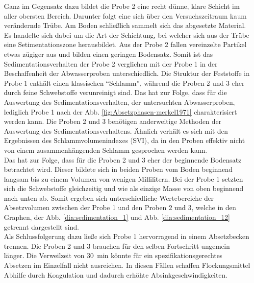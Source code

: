 Ganz im Gegensatz dazu bildet die Probe 2  eine recht dünne, klare Schicht im aller obersten Bereich. Darunter folgt eine sich über den Versuchszeitraum kaum verändernde Trübe. Am Boden schließlich sammelt sich das abgesetzte Material. Es handelte sich dabei um die Art der Schichtung, bei welcher sich aus der Trübe eine Setimentationszone herausbildet. Aus der Probe 2 fallen vereinzelte Partikel etwas zügiger aus und bilden einen geringen Bodensatz. Somit ist das Sedimentationsverhalten der Probe 2 verglichen mit der Probe 1 in der Beschaffenheit der Abwasserproben unterschiedlich.
Die Struktur der Feststoffe in Probe 1 enthält einen klassischen "`Schlamm"', während die Proben 2 und 3 eher durch feine Schwebstoffe verunreinigt sind. Das hat zur Folge, dass für die Auswertung des Sedimentationsverhalten, der untersuchten Abwasserproben, lediglich Probe 1 nach der Abb. \ref{fig:Absetzphasen-merkel1971} charakterisiert werden kann. 
\newpage
Die Proben 2 und 3 benötigen anderweitige Methoden der Auswertung des Sedimentationsverhaltens. Ähnlich verhält es sich mit den Ergebnissen des Schlammvolumenindexes (SVI), da in den Proben effektiv nicht von einem zusammenhängenden Schlamm gesprochen werden kann.\\
Das hat zur Folge, dass für die Proben 2 und 3 eher der beginnende Bodensatz betrachtet wird. Dieser bildete sich in beiden Proben vom Boden beginnend langsam bis zu einem Volumen von wenigen Millilitern.
Bei der Probe 1 setzten sich  die Schwebstoffe gleichzeitig und wie als einzige Masse von oben beginnend nach unten ab. Somit ergeben sich unterschiedliche Wertebereiche der Absetzvolumen zwischen der Probe 1 und den Proben 2 und 3, welche in den Graphen, der Abb. \ref{dia:sedimentation_1} und Abb. \ref{dia:sedimentation_12} getrennt dargestellt sind.\\
Als Schlussfolgerung dazu ließe sich Probe 1 hervorragend in einem Absetzbecken trennen. Die Proben 2 und 3 brauchen für den selben Fortschritt ungemein länger. Die Verweilzeit von \SI{30}{\minute} könnte für ein spezifikationsgerechtes Absetzen im Einzelfall nicht ausreichen. In diesen Fällen schaffen Flockungsmittel Abhilfe durch Koagulation und dadurch erhöhte Absinkgeschwindigkeiten.\\




